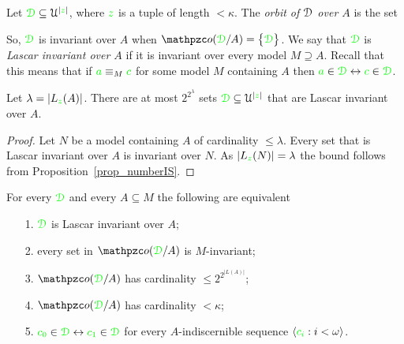 \documentclass[creche.tex]{subfiles}
\begin{document}
Let ${\color{green}\EuScript D}\subseteq\EuScript U^{|{\color{green} z}|}$, where ${\color{green} z}$ is a tuple of length $<\kappa$. The \emph{orbit of $\EuScript D$ over $A$\/} is the set


So, ${\color{green}\EuScript D}$ is invariant over $A$ when $\oorbit(\grD/A)=\big\{\grD\big\}$. We say that ${\color{green}\EuScript D}$ is \emph{Lascar invariant over $A$\/} if it is invariant over every model $M\supseteq A$. Recall that this means that if ${\color{green} a}\equiv_M{\color{green} c}$ for some model $M$ containing $A$ then ${\color{green} a}\in{\color{green}\EuScript D}\leftrightarrow{\color{green}c}\in{\color{green}\EuScript D}$.


\begin{proposition}\label{prop_numero_quasi_invarianti}
  Let $\lambda=|L_{\color{green} z}(A)|$. There are at most $2^{2^{\lambda}}$ sets ${\color{green}\EuScript D}\subseteq\EuScript U^{|{\color{green} z}|}$ that are Lascar invariant over $A$.
\end{proposition}

\begin{proof}
  Let $N$ be a model containing $A$ of cardinality $\le\lambda$. Every set that is Lascar invariant over $A$ is invariant over $N$. As $|L_{\color{green} z}(N)|=\lambda$ the bound follows from Proposition~\ref{prop_numberIS}.
\end{proof}

\begin{theorem}\label{thm_Lascar_indiscernibles}
  For every ${\color{green}\EuScript D}$ and every $A\subseteq M$ the following are equivalent
  \begin{itemize}
    \item[1.] ${\color{green}\EuScript D}$ is Lascar invariant over $A$;
    \item[2.] every set in $\oorbit(\grD/A)$ is $M\mbox{-}$invariant;
    \item[3.] $\oorbit(\grD/A)$ has cardinality $\le 2^{2^{|L(A)|}}$;
    \item[4.] $\oorbit(\grD/A)$ has cardinality $<\kappa$;
    \item[5.] ${\color{green} c_0}\in{\color{green}\EuScript D}\leftrightarrow{\color{green}c_1}\in{\color{green}\EuScript D}$ for every $A\mbox{-}$indiscernible sequence $\langle{\color{green}c_i}:i<\omega\rangle$.
  \end{itemize}
\end{theorem}
\end{document}
